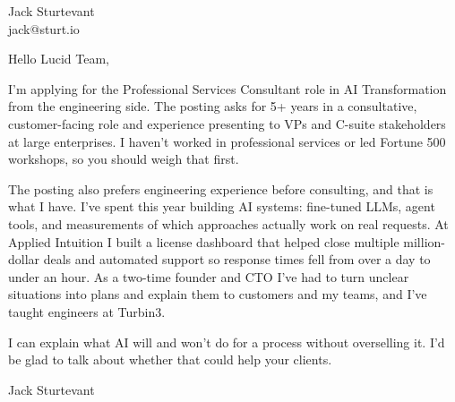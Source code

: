 \documentclass[11pt]{article}
\begin{document}
\raggedright

{\namefont\fontsize{20pt}{24pt}\selectfont Jack Sturtevant}\\[-0.3em]
jack@sturt.io

\vspace{1.2em}

Hello Lucid Team,

I'm applying for the Professional Services Consultant role in AI Transformation from the engineering side. The posting asks for 5+ years in a consultative, customer-facing role and experience presenting to VPs and C-suite stakeholders at large enterprises. I haven't worked in professional services or led Fortune 500 workshops, so you should weigh that first.

The posting also prefers engineering experience before consulting, and that is what I have. I've spent this year building AI systems: fine-tuned LLMs, agent tools, and measurements of which approaches actually work on real requests. At Applied Intuition I built a license dashboard that helped close multiple million-dollar deals and automated support so response times fell from over a day to under an hour. As a two-time founder and CTO I've had to turn unclear situations into plans and explain them to customers and my teams, and I've taught engineers at Turbin3.

I can explain what AI will and won't do for a process without overselling it. I'd be glad to talk about whether that could help your clients.

\vspace{0.6em}
Jack Sturtevant
\end{document}
